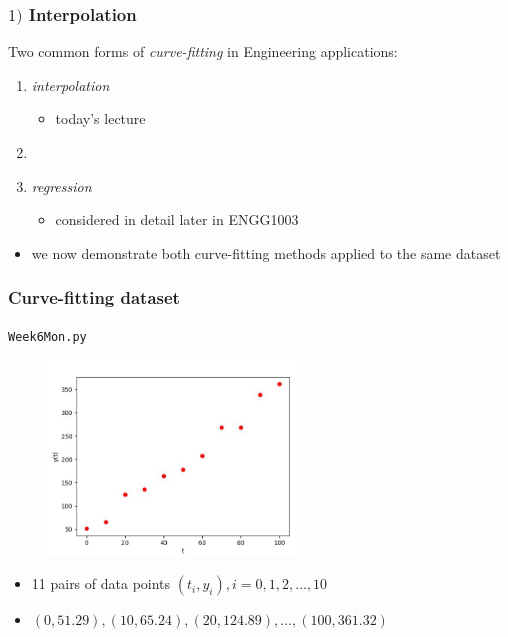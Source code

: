 \documentclass[english,14pt]{beamer}
\newcommand\red[1]{{\color{red} #1}}
\begin{document}
\begin{frame}[fragile]

\frametitle{$1)$ Interpolation}

Two common forms of \red{\emph{curve-fitting}} in Engineering applications:

\begin{enumerate}
	\item \red{\emph{interpolation}}
	\begin{itemize}
		\item today's lecture
	\end{itemize}
	\item[]
	\item \red{\emph{regression}}
	\begin{itemize}
		\item considered in detail later in ENGG1003
	\end{itemize}
\end{enumerate}
	
\begin{itemize}
	\item we now demonstrate both curve-fitting methods applied to the same dataset
\end{itemize}

\end{frame}


\begin{frame}[fragile]

\frametitle{Curve-fitting dataset}

\texttt{Week6Mon.py}
\vspace*{-3mm}
\begin{figure}[ht]
	\centering
	\includegraphics[width=0.6\textwidth]{figures/Week6MonDataset}
\end{figure}
\vspace*{-5mm}
\begin{itemize}
	\item 11 pairs of data points $(t_i,y_i), i = 0,1,2,\ldots,10$
	\item[] {\small $(0,51.29), (10,65.24), (20,124.89), \ldots,(100,361.32)$}
\end{itemize}

\end{frame}
\end{document}

